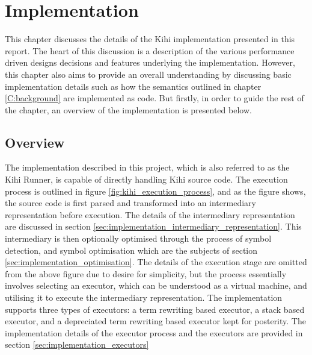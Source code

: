 \chapter{Implementation} \label{C:implementation} 

This chapter discusses the details of the Kihi implementation presented in this report. The heart of this discussion is a description of the various performance driven designs decisions and features underlying the implementation. However, this chapter also aims to provide an overall understanding by discussing basic implementation details such as how the semantics outlined in chapter \ref{C:background} are implemented as code. But firstly, in order to guide the rest of the chapter, an overview of the implementation is presented below.

\section{Overview}

The implementation described in this project, which is also referred to as the Kihi Runner, is capable of directly handling Kihi source code. The execution process is outlined in figure \ref{fig:kihi_execution_process}, and as the figure shows, the source code is first parsed and transformed into an intermediary representation before execution. The details of the intermediary representation are discussed in section \ref{sec:implementation_intermediary_representation}. This intermediary is then optionally optimised through the process of symbol detection, and symbol optimisation which are the subjects of section \ref{sec:implementation_optimisation}. The details of the execution stage are omitted from the above figure due to desire for simplicity, but the process essentially involves selecting an executor, which can be understood as a virtual machine, and utilising it to execute the intermediary representation. The implementation supports three types of executors: a term rewriting based executor, a stack based executor, and a depreciated term rewriting based executor kept for posterity. The implementation details of the executor process and the executors are provided in section \ref{sec:implementation_executors}


